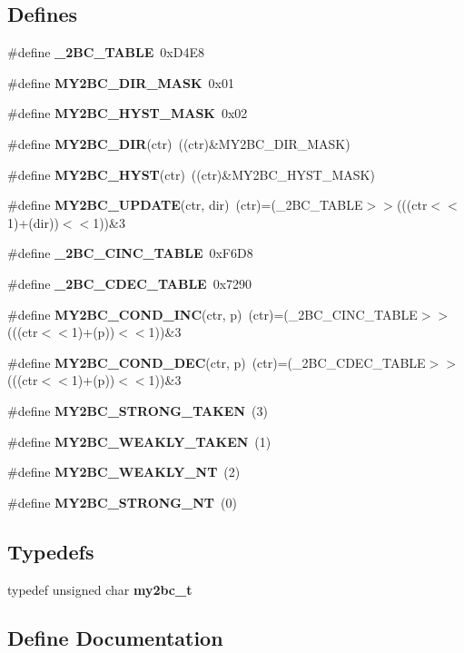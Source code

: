 \subsection*{Defines}
\begin{CompactItemize}
\item 
\#define {\bf \_\-2BC\_\-TABLE}~0xD4E8
\item 
\#define {\bf MY2BC\_\-DIR\_\-MASK}~0x01
\item 
\#define {\bf MY2BC\_\-HYST\_\-MASK}~0x02
\item 
\#define {\bf MY2BC\_\-DIR}(ctr)~((ctr)\&MY2BC\_\-DIR\_\-MASK)
\item 
\#define {\bf MY2BC\_\-HYST}(ctr)~((ctr)\&MY2BC\_\-HYST\_\-MASK)
\item 
\#define {\bf MY2BC\_\-UPDATE}(ctr, dir)~(ctr)=(\_\-2BC\_\-TABLE$>$$>$(((ctr$<$$<$1)+(dir))$<$$<$1))\&3
\item 
\#define {\bf \_\-2BC\_\-CINC\_\-TABLE}~0xF6D8
\item 
\#define {\bf \_\-2BC\_\-CDEC\_\-TABLE}~0x7290
\item 
\#define {\bf MY2BC\_\-COND\_\-INC}(ctr, p)~(ctr)=(\_\-2BC\_\-CINC\_\-TABLE$>$$>$(((ctr$<$$<$1)+(p))$<$$<$1))\&3
\item 
\#define {\bf MY2BC\_\-COND\_\-DEC}(ctr, p)~(ctr)=(\_\-2BC\_\-CDEC\_\-TABLE$>$$>$(((ctr$<$$<$1)+(p))$<$$<$1))\&3
\item 
\#define {\bf MY2BC\_\-STRONG\_\-TAKEN}~(3)
\item 
\#define {\bf MY2BC\_\-WEAKLY\_\-TAKEN}~(1)
\item 
\#define {\bf MY2BC\_\-WEAKLY\_\-NT}~(2)
\item 
\#define {\bf MY2BC\_\-STRONG\_\-NT}~(0)
\end{CompactItemize}
\subsection*{Typedefs}
\begin{CompactItemize}
\item 
typedef unsigned char {\bf my2bc\_\-t}
\end{CompactItemize}


\subsection{Define Documentation}
